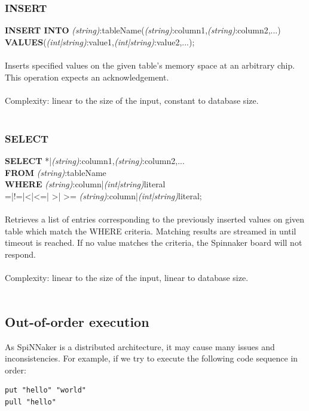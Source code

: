 \subsubsection{INSERT}   
   
 \noindent
  {\large\textbf{INSERT INTO} \textit{(string)}:tableName(\textit{(string)}:column1,\textit{(string)}:column2,...)\\
  \textbf{VALUES}(\textit{(int|string)}:value1,\textit{(int|string)}:value2,...);}\\\\
\noindent
  Inserts specified values on the given table's memory space at an arbitrary chip. This operation expects an acknowledgement.\\\\
\noindent
   Complexity: linear to the size of the input, constant to database size.\\\\

\subsubsection{SELECT}   
   
\noindent
  {\large\textbf{SELECT} *|\textit{(string)}:column1,\textit{(string)}:column2,...\\
  \textbf{FROM} \textit{(string)}:tableName\\
  \textbf{WHERE} \textit{(string)}:column|\textit{(int|string)}literal \\=|!=|\textless |\textless =|
  \textgreater | \textgreater = \textit{(string)}:column|\textit{(int|string)}literal;}\\\\
\noindent
  Retrieves a list of entries corresponding to the previously inserted values on given table which match the WHERE criteria. Matching results are streamed in until timeout is reached. If no value matches the criteria, the Spinnaker board will not respond.\\\\
\noindent
Complexity: linear to the size of the input, linear to database size.\\\\
  
\subsection{Out-of-order execution}
As SpiNNaker is a distributed architecture, it may cause many issues and inconsistencies.
For example, if we try to execute the following code sequence in order:\\
\begin{lstlisting}[caption={Non-blocking execution}, label=list:non-blocking]
put "hello" "world"
pull "hello"
\end{lstlisting}

